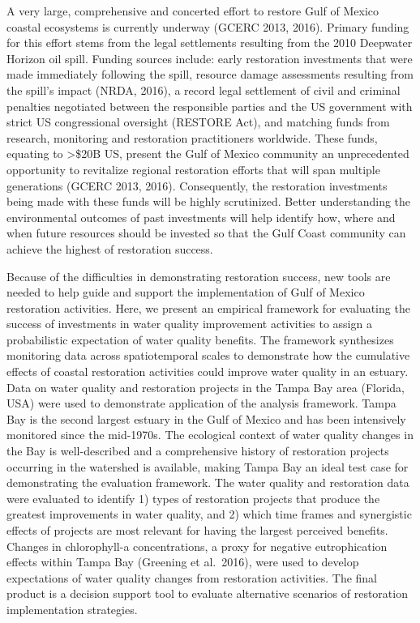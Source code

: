\documentclass[]{article}
\begin{document}
A very large, comprehensive and concerted effort to restore Gulf of
Mexico coastal ecosystems is currently underway (GCERC 2013, 2016).
Primary funding for this effort stems from the legal settlements
resulting from the 2010 Deepwater Horizon oil spill. Funding sources
include: early restoration investments that were made immediately
following the spill, resource damage assessments resulting from the
spill's impact (NRDA, 2016), a record legal settlement of civil and
criminal penalties negotiated between the responsible parties and the US
government with strict US congressional oversight (RESTORE Act), and
matching funds from research, monitoring and restoration practitioners
worldwide. These funds, equating to \textgreater{}\$20B US, present the
Gulf of Mexico community an unprecedented opportunity to revitalize
regional restoration efforts that will span multiple generations (GCERC
2013, 2016). Consequently, the restoration investments being made with
these funds will be highly scrutinized. Better understanding the
environmental outcomes of past investments will help identify how, where
and when future resources should be invested so that the Gulf Coast
community can achieve the highest of restoration success.

Because of the difficulties in demonstrating restoration success, new
tools are needed to help guide and support the implementation of Gulf of
Mexico restoration activities. Here, we present an empirical framework
for evaluating the success of investments in water quality improvement
activities to assign a probabilistic expectation of water quality
benefits. The framework synthesizes monitoring data across
spatiotemporal scales to demonstrate how the cumulative effects of
coastal restoration activities could improve water quality in an
estuary. Data on water quality and restoration projects in the Tampa Bay
area (Florida, USA) were used to demonstrate application of the analysis
framework. Tampa Bay is the second largest estuary in the Gulf of Mexico
and has been intensively monitored since the mid-1970s. The ecological
context of water quality changes in the Bay is well-described and a
comprehensive history of restoration projects occurring in the watershed
is available, making Tampa Bay an ideal test case for demonstrating the
evaluation framework. The water quality and restoration data were
evaluated to identify 1) types of restoration projects that produce the
greatest improvements in water quality, and 2) which time frames and
synergistic effects of projects are most relevant for having the largest
perceived benefits. Changes in chlorophyll-a concentrations, a proxy for
negative eutrophication effects within Tampa Bay (Greening et al.~2016),
were used to develop expectations of water quality changes from
restoration activities. The final product is a decision support tool to
evaluate alternative scenarios of restoration implementation strategies.
\end{document}
